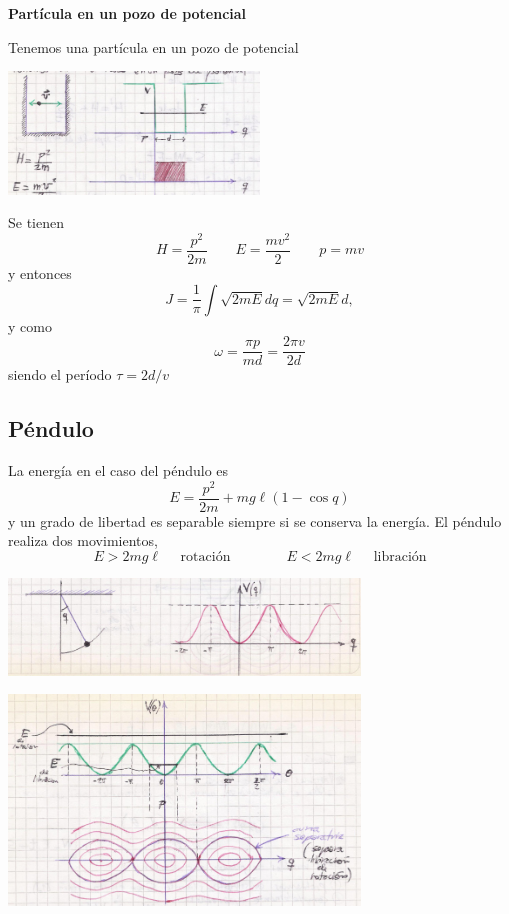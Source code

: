 \documentclass[10pt,oneside]{CBFT_book}
\begin{document}
\begin{ejemplo}{\bf Partícula en un pozo de potencial}

Tenemos una partícula en un pozo de potencial

\includegraphics[width=0.5\textwidth]{images/fig_mc_angacc2.jpg}
 
Se tienen 
\[
	H = \frac{p^2}{2m} \qquad E = \frac{m v^2}{2} \qquad p = m v
\]
y entonces
\[
	J = \frac{1}{\pi} \int \sqrt{2 m E} dq = \sqrt{2 m E} d,
\]
y como 
\[
	\omega = \frac{\pi p}{m d} = \frac{2\pi v}{2d}
\]
siendo el período $\tau = 2d/v$
 
\end{ejemplo}


\subsection{Péndulo}

La energía en el caso del péndulo es
\[
	E = \frac{p^2}{2m} + m g \ell ( 1 - \cos q )
\]
y un grado de libertad es separable siempre si se conserva la energía.
El péndulo realiza dos movimientos,
\[
	E > 2mg\ell \quad \text{ rotación} \qquad \qquad E < 2mg\ell \quad \text{ libración}
\]

\includegraphics[width=0.7\textwidth]{images/fig_mc_pendulo_angacc1.jpg}

\includegraphics[width=0.7\textwidth]{images/fig_mc_pendulo_angacc2.jpg}
\end{document}
